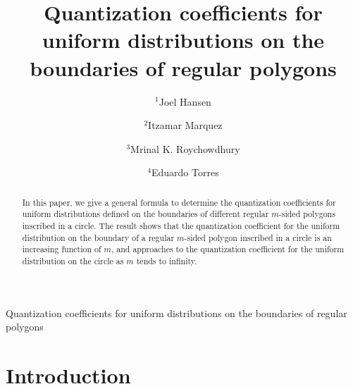 \documentclass[12pt]{amsart}
\theoremstyle{plain}
\theoremstyle{definition}
\begin{document}
\title{Quantization coefficients for uniform distributions on the boundaries of regular polygons}



\address{School of Mathematical and Statistical Sciences\\
University of Texas Rio Grande Valley\\
1201 West University Drive\\
Edinburg, TX 78539-2999, USA.}




\author{$^1$Joel Hansen}
\author{$^2$Itzamar Marquez}
\author{$^3$Mrinal K. Roychowdhury}
\author{$^4$Eduardo Torres}






\date{}
\maketitle

\pagestyle{myheadings}
{Quantization coefficients for uniform distributions on the boundaries of regular polygons}

\begin{abstract}
In this paper, we give a general formula to determine the quantization coefficients for uniform distributions defined on the boundaries of different regular $m$-sided polygons inscribed in a circle. The result shows that the quantization coefficient for the uniform distribution on the boundary of a regular $m$-sided polygon inscribed in a circle is an increasing function of $m$, and approaches to the quantization coefficient for the uniform distribution on the circle as $m$ tends to infinity.
\end{abstract}








\section{Introduction}
\end{document}
